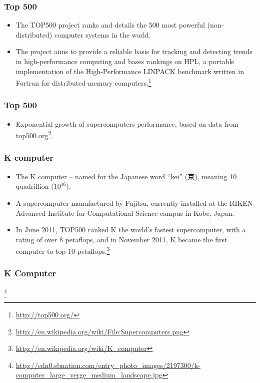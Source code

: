 \documentclass{beamer}
\begin{document}
\begin{CJK}{UTF8}{bsmi}
\begin{frame}
\frametitle{Top 500}
\begin{itemize}
\item The TOP500 project ranks and details the 500 most powerful
  (non-distributed) computer systems in the world.
\item The project aims to provide a reliable basis for tracking and
  detecting trends in high-performance computing and bases rankings on
  HPL, a portable implementation of the High-Performance LINPACK
  benchmark written in Fortran for distributed-memory computers.\footnote{\url{http://top500.org/}}
\end{itemize}
\end{frame}

\begin{frame}
\frametitle{Top 500}
\centerline{}
\begin{itemize}
\item Exponential growth of supercomputers performance, based on data
  from top500.org\footnote{\url{http://en.wikipedia.org/wiki/File:Supercomputers.png}}.
\end{itemize}
\end{frame}

\begin{frame}
\frametitle{K computer}
\begin{itemize}
\item The K computer -- named for the Japanese word ``kei'' (京),
  meaning 10 quadrillion ($10^{16}$).
\item A supercomputer manufactured by Fujitsu, currently installed at
  the RIKEN Advanced Institute for Computational Science campus in
  Kobe, Japan.
\item In June 2011, TOP500 ranked K the world's fastest supercomputer,
  with a rating of over 8 petaflops, and in November 2011, K became
  the first computer to top 10 petaflops.\footnote{\url{http://en.wikipedia.org/wiki/K_computer}}
\end{itemize}
\end{frame}

\begin{frame}
\frametitle{K Computer}
\centerline{}
\footnote{\url{http://cdn0.sbnation.com/entry_photo_images/2197300/k-computer_large_verge_medium_landscape.jpg}}
\end{frame}


\end{CJK}
\end{document}

